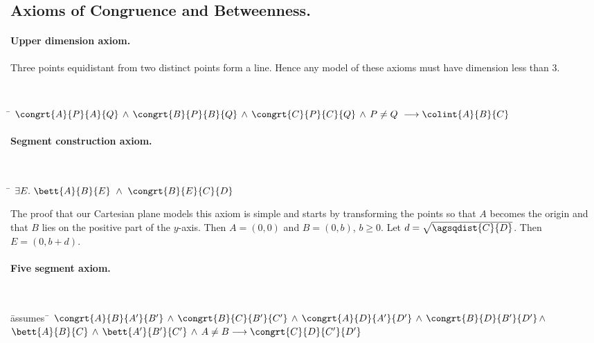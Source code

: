 \subsection{Axioms of Congruence and Betweenness.}
\paragraph{Upper dimension axiom.}
Three points equidistant from two distinct points form a line. Hence
any model of these axioms must have dimension less than 3.

{\tt
\begin{tabbing}
\hspace{5mm}\=\kill
$\congrt{A}{P}{A}{Q} \,\wedge\, \congrt{B}{P}{B}{Q} \,\wedge\, \congrt{C}{P}{C}{Q} \,\wedge\,  P \neq Q \ \longrightarrow \colint{A}{B}{C}$
\end{tabbing}
}

\begin{center}

\end{center}



\paragraph{Segment construction axiom.}
{\tt
\begin{tabbing}
\hspace{5mm}\=\kill
$\exists E.\ \bett{A}{B}{E}\ \wedge\ \congrt{B}{E}{C}{D}$
\end{tabbing}
}

The proof that our Cartesian plane models this axiom is simple and
starts by transforming the points so that $A$ becomes the origin and
that $B$ lies on the positive part of the $y$-axis. Then $A = (0, 0)$
and $B = (0, b)$, $b \ge 0$. Let $d = \sqrt{\agsqdist{C}{D}}$. Then $E
= (0, b + d)$.

\paragraph{Five segment axiom.}
{\tt
\begin{tabbing}
\hspace{5mm}\=assumes\ \=\kill
$\congrt{A}{B}{A'}{B'} \,\wedge\, \congrt{B}{C}{B'}{C'}  \,\wedge\,  \congrt{A}{D}{A'}{D'}  \,\wedge\,  \congrt{B}{D}{B'}{D'} \,\wedge\,$\\
\>$\bett{A}{B}{C} \,\wedge\, \bett{A'}{B'}{C'} \,\wedge\, A \neq B \longrightarrow  \congrt{C}{D}{C'}{D'}$
\end{tabbing}
}

